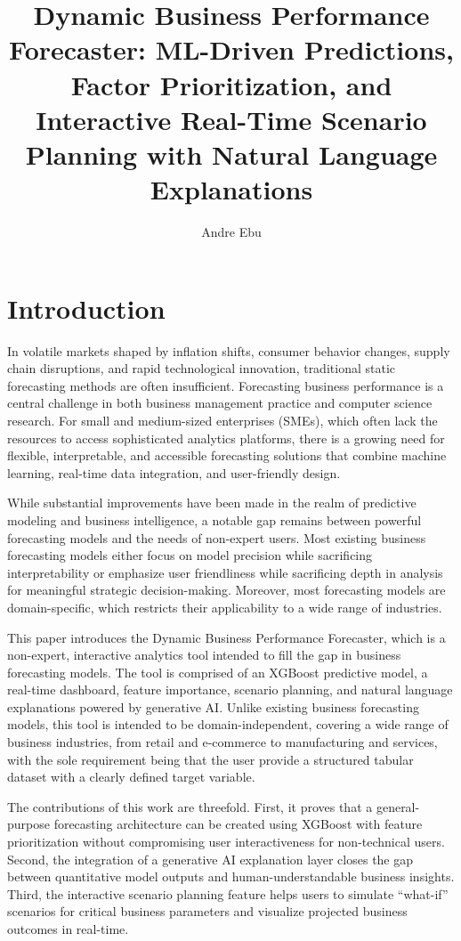 \documentclass[12pt]{article}
\title{\textbf{Dynamic Business Performance Forecaster: ML-Driven Predictions, Factor Prioritization, and Interactive Real-Time Scenario Planning with Natural Language Explanations}}
\author{Andre Ebu}
\begin{document}
\maketitle

\section{Introduction}
In volatile markets shaped by inflation shifts, consumer behavior changes, supply chain
disruptions, and rapid technological innovation, traditional static forecasting methods are
often insufficient. Forecasting business performance is a central challenge in both business management practice and computer science research. For small and medium-sized enterprises (SMEs), which often lack the resources to access sophisticated analytics platforms, there is a growing need for flexible, interpretable, and accessible forecasting solutions that combine machine learning, real-time data integration, and user-friendly design.

While substantial improvements have been made in the realm of predictive modeling and business intelligence, a notable gap remains between powerful forecasting models and the needs of non-expert users. Most existing business forecasting models either focus on model precision while sacrificing interpretability or emphasize user friendliness while sacrificing depth in analysis for meaningful strategic decision-making. Moreover, most forecasting models are domain-specific, which restricts their applicability to a wide range of industries.

This paper introduces the Dynamic Business Performance Forecaster, which is a non-expert, interactive analytics tool intended to fill the gap in business forecasting models. The tool is comprised of an XGBoost predictive model, a real-time dashboard, feature importance, scenario planning, and natural language explanations powered by generative AI. Unlike existing business forecasting models, this tool is intended to be domain-independent, covering a wide range of business industries, from retail and e-commerce to manufacturing and services, with the sole requirement being that the user provide a structured tabular dataset with a clearly defined target variable.

The contributions of this work are threefold. First, it proves that a general-purpose forecasting architecture can be created using XGBoost with feature prioritization without compromising user interactiveness for non-technical users. Second, the integration of a generative AI explanation layer closes the gap between quantitative model outputs and human-understandable business insights. Third, the interactive scenario planning feature helps users to simulate “what-if” scenarios for critical business parameters and visualize projected business outcomes in real-time.
\end{document}
